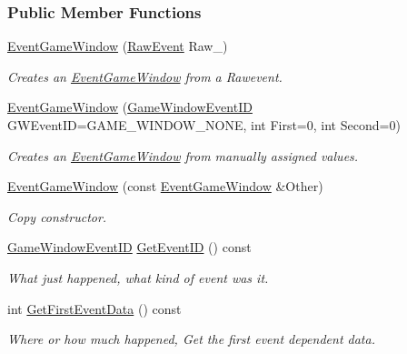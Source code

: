 \subsubsection*{Public Member Functions}
\begin{DoxyCompactItemize}
\item 
\hyperlink{classMezzanine_1_1EventGameWindow_a1ba3b047ac8203c5b1d33644f365039b}{EventGameWindow} (\hyperlink{namespaceMezzanine_ae8d4c0ab783af89a250b0225b75753e5}{RawEvent} Raw\_\-)
\begin{DoxyCompactList}\small\item\em Creates an \hyperlink{classMezzanine_1_1EventGameWindow}{EventGameWindow} from a Rawevent. \item\end{DoxyCompactList}\item 
\hyperlink{classMezzanine_1_1EventGameWindow_a9a7ca5ec6fe5f95244e6133b6627d4ac}{EventGameWindow} (\hyperlink{classMezzanine_1_1EventGameWindow_a0f0ff29853317334f018bcf48d502af2}{GameWindowEventID} GWEventID=GAME\_\-WINDOW\_\-NONE, int First=0, int Second=0)
\begin{DoxyCompactList}\small\item\em Creates an \hyperlink{classMezzanine_1_1EventGameWindow}{EventGameWindow} from manually assigned values. \item\end{DoxyCompactList}\item 
\hyperlink{classMezzanine_1_1EventGameWindow_aec071261cc581c6b6767f77691e20996}{EventGameWindow} (const \hyperlink{classMezzanine_1_1EventGameWindow}{EventGameWindow} \&Other)
\begin{DoxyCompactList}\small\item\em Copy constructor. \item\end{DoxyCompactList}\item 
\hyperlink{classMezzanine_1_1EventGameWindow_a0f0ff29853317334f018bcf48d502af2}{GameWindowEventID} \hyperlink{classMezzanine_1_1EventGameWindow_ace6bd54e020a18818027cdfc88970e81}{GetEventID} () const 
\begin{DoxyCompactList}\small\item\em What just happened, what kind of event was it. \item\end{DoxyCompactList}\item 
int \hyperlink{classMezzanine_1_1EventGameWindow_aff42c9bc5c487536e2101547da8162e8}{GetFirstEventData} () const 
\begin{DoxyCompactList}\small\item\em Where or how much happened, Get the first event dependent data. \item\end{DoxyCompactList}\item 

\end{DoxyCompactItemize}
